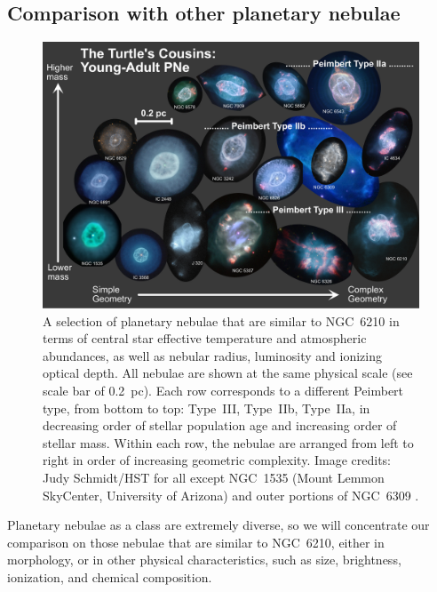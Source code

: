 \documentclass[useAMS, usenatbib]{mnras}
\begin{document}
\subsection{Comparison with other planetary nebulae}
\label{sec:comp-with-other}

\begin{figure}
  \centering
  \includegraphics[width=\linewidth]{figs/cousins-of-the-turtle}
  \caption{
    A selection of planetary nebulae that are similar to NGC~6210
    in terms of central star effective temperature and atmospheric abundances,
    as well as nebular radius, luminosity and ionizing optical depth.
    All nebulae are shown at the same physical scale (see scale bar of \SI{0.2}{pc}).
    Each row corresponds to a different Peimbert type, from bottom to top:
    Type~III, Type~IIb, Type~IIa,
    in decreasing order of stellar population age
    and increasing order of stellar mass.
    Within each row, the nebulae are arranged from left to right
    in order of increasing geometric complexity.
    Image credits: Judy Schmidt/HST for all except
    NGC~1535 (Mount Lemmon SkyCenter, University of Arizona)
    and outer portions of NGC~6309 \citep{Rubio:2015a}.
  }
  \label{fig:cousins}
\end{figure}


Planetary nebulae as a class are extremely diverse,
so we will concentrate our comparison on those nebulae that are similar to NGC~6210,
either in morphology,
or in other physical characteristics, such as size, brightness, ionization,
and chemical composition.
\end{document}
